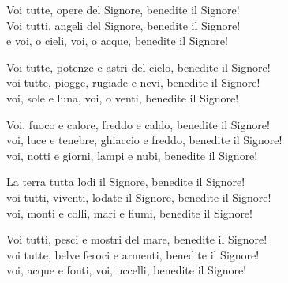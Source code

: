 

\spazio

\strofa Voi tutte, opere del Signore, benedite il Signore!\\
Voi tutti, angeli del Signore, benedite il Signore!\\
e voi, o cieli, voi, o acque, benedite il Signore!

\spazio


\spazio

\strofa	Voi tutte, potenze e astri del cielo, benedite il Signore!\\	
voi tutte, piogge, rugiade e nevi, benedite il Signore!\\
voi, sole e luna, voi, o venti, benedite il Signore!

\spazio


\spazio

\strofa	Voi, fuoco e calore, freddo e caldo, benedite il Signore!\\
voi, luce e tenebre, ghiaccio e freddo, benedite il Signore!\\
voi, notti e giorni, lampi e nubi, benedite il Signore!

\spazio


\spazio

\strofa La terra tutta lodi il Signore, benedite il Signore!\\
voi tutti, viventi, lodate il Signore, benedite il Signore!\\
voi, monti e colli, mari e fiumi, benedite il Signore!

\spazio


\spazio

\strofa	Voi tutti, pesci e mostri del mare, benedite il Signore!\\
voi tutte, belve feroci e armenti, benedite il Signore!\\
voi, acque e fonti, voi, uccelli, benedite il Signore!

\spazio


